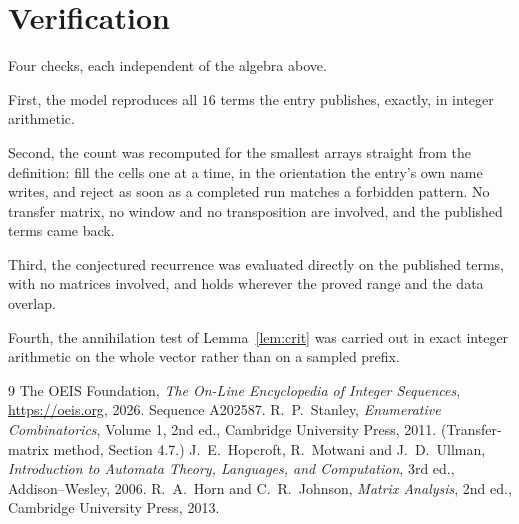 \documentclass[11pt,a4paper]{article}
\theoremstyle{plain}
\theoremstyle{definition}
\begin{document}
\section{Verification}

Four checks, each independent of the algebra above.

First, the model reproduces all $16$ terms the entry publishes, exactly, in integer
arithmetic.

Second, the count was recomputed for the smallest arrays straight from the definition: fill the
cells one at a time, in the orientation the entry's own name writes, and reject as soon as a
completed run matches a forbidden pattern. No transfer matrix, no window and no transposition
are involved, and the published terms came back.

Third, the conjectured recurrence was evaluated directly on the published terms, with no
matrices involved, and holds wherever the proved range and the data overlap.

Fourth, the annihilation test of Lemma~\ref{lem:crit} was carried out in exact integer
arithmetic on the whole vector rather than on a sampled prefix.

\begin{thebibliography}{9}
 The OEIS Foundation, \emph{The On-Line Encyclopedia of Integer
Sequences}, \url{https://oeis.org}, 2026. Sequence A202587.
 R.~P.~Stanley, \emph{Enumerative Combinatorics}, Volume 1, 2nd ed.,
Cambridge University Press, 2011. (Transfer-matrix method, Section 4.7.)
 J.~E.~Hopcroft, R.~Motwani and J.~D.~Ullman, \emph{Introduction to Automata
Theory, Languages, and Computation}, 3rd ed., Addison--Wesley, 2006.
 R.~A.~Horn and C.~R.~Johnson, \emph{Matrix Analysis}, 2nd ed., Cambridge
University Press, 2013.
\end{thebibliography}
\end{document}
